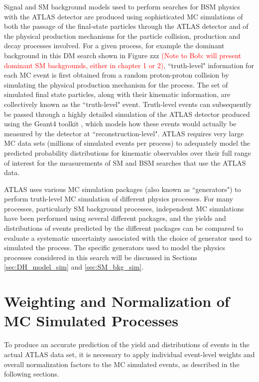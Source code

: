 Signal and SM background models used to perform searches for BSM physics with the ATLAS detector are produced using sophisticated MC simulations of both the passage of the final-state particles through the ATLAS detector and of the physical production mechanisms for the particle collision, production and decay processes involved. For a given process, for example the dominant \wjets background in this DM search shown in Figure zzz \textcolor{red}{(Note to Bob: will present dominant SM backgrounds, either in chapter 1 or 2)}, ``truth-level" information for each MC event is first obtained from a random proton-proton collision by simulating the physical production mechanism for the process. The set of simulated final state particles, along with their kinematic information, are collectively known as the ``truth-level" event. Truth-level events can subsequently be passed through a highly detailed  simulation of the ATLAS detector \cite{atlas_sim} produced using the Geant4 toolkit \cite{Geant4}, which models how these events would actually be measured by the detector at ``reconstruction-level". ATLAS requires very large MC data sets (millions of simulated events per process) to adequately model the predicted probability distributions for kinematic observables over their full range of interest for the measurements of SM and BSM searches that use the ATLAS data.

ATLAS uses various MC simulation packages (also known as ``generators") to perform truth-level MC simulation of different physics processes. For many processes, particularly SM background processes, independent MC simulations have been performed using several different packages, and the yields and distributions of events predicted by the different packages can be compared to evaluate a systematic uncertainty associated with the choice of generator used to simulated the process. The specific generators used to model the physics processes considered in this search will be discussed in Sections \ref{sec:DH_model_sim} and \ref{sec:SM_bkg_sim}.

\section{Weighting and Normalization of MC Simulated Processes}

To produce an accurate prediction of the yield and distributions of events in the actual ATLAS data set, it is necessary to apply individual event-level weights and overall normalization factors to the MC simulated events, as described in the following sections.

